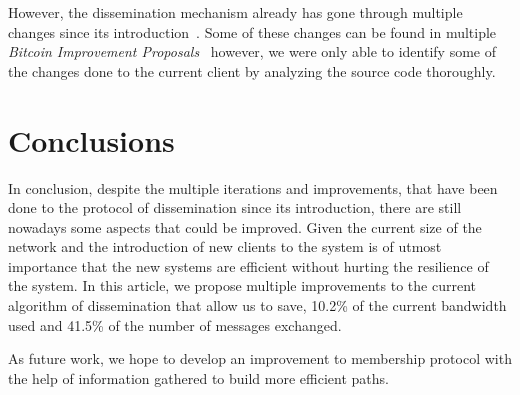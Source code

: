 \documentclass{dads}   %
\begin{document}
However, the dissemination mechanism already has gone through multiple changes since its introduction~\cite{nakamoto2008bitcoin}. Some of these changes can be found in multiple \textsl{Bitcoin Improvement Proposals}~\cite{bip152,bips} however, we were only able to identify some of the changes done to the current client by analyzing the source code thoroughly. 

\section{Conclusions}
In conclusion, despite the multiple iterations and improvements, that have been done to the protocol of dissemination since its introduction, there are still nowadays some aspects that could be improved. Given the current size of the network and the introduction of new clients to the system is of utmost importance that the new systems are efficient without hurting the resilience of the system. In this article, we propose multiple improvements to the current algorithm of dissemination that allow us to save, 10.2\% of the current bandwidth used and 41.5\% of the number of messages exchanged.

As future work, we hope to develop an improvement to membership protocol with the help of information gathered to build more efficient paths.


%

%
%
\end{document}
